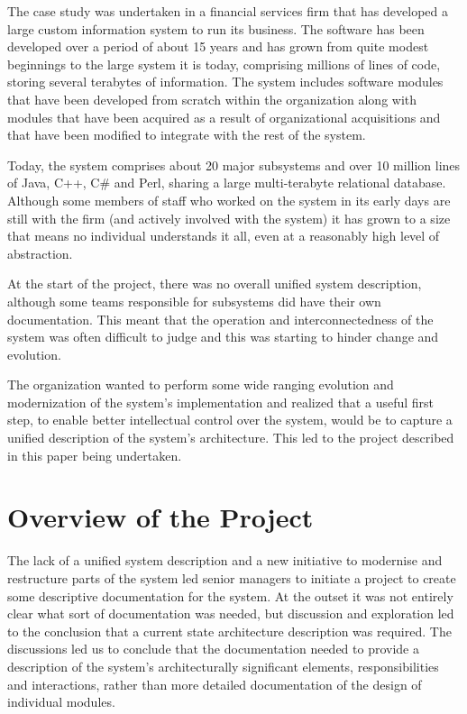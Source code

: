   The case study was undertaken in a financial services firm that has developed a large custom information system to run its business.  The software has been developed over a period of about 15 years and has grown from quite modest beginnings to the large system it is today, comprising millions of lines of code, storing several terabytes of information.  The system includes software modules that have been developed from scratch within the organization along with modules that have been acquired as a result of organizational acquisitions and that have been modified to integrate with the rest of the system.

  Today, the system comprises about 20 major subsystems and over 10 million lines of Java, C++, C\# and Perl, sharing a large multi-terabyte relational database.  Although some members of staff who worked on the system in its early days are still with the firm (and actively involved with the system) it has grown to a size that means no individual understands it all, even at a reasonably high level of abstraction.

  At the start of the project, there was no overall unified system description, although some teams responsible for subsystems did have their own documentation. This meant that the operation and interconnectedness of the system was often difficult to judge and this was starting to hinder change and evolution.

  The organization wanted to perform some wide ranging evolution and modernization of the system's implementation and realized that a useful first step, to enable better intellectual control over the system, would be to capture a unified description of the system's architecture.  This led to the project described in this paper being undertaken.

\section{Overview of the Project}

  The lack of a unified system description and a new initiative to modernise and restructure parts of the system led senior managers to initiate a project to create some descriptive documentation for the system.  At the outset it was not entirely clear what sort of documentation was needed, but discussion and exploration led to the conclusion that a current state architecture description was required.  The discussions led us to conclude that the documentation needed to provide a description of the system's architecturally significant elements, responsibilities and interactions, rather than more detailed documentation of the design of individual modules.

